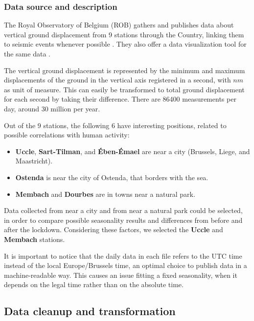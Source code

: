 \documentclass[12pt]{article}
\begin{document}
\subsubsection{Data source and description}
The Royal Observatory of Belgium (ROB) gathers and publishes \cite{RoyalDataPolicy,Data20200402} data about vertical ground displacement from 9 stations through the Country, linking them to seismic events whenever possible \cite{DataEvents20200402}. They also offer a data visualization tool for the same data \cite{DataVisualization20200402}.

The vertical ground displacement is represented by the minimum and maximum displacements of the ground in the vertical axis registered in a second, with $nm$ as unit of measure. This can easily be transformed to total ground displacement for each second by taking their difference. There are 86400 measurements per day, around 30 million per year.

Out of the 9 stations, the following 6 have interesting positions, related to possible correlations with human activity:
\begin{itemize}[topsep=0.5em,itemsep=0em,partopsep=0.5em]
	\item \textbf{Uccle}, \textbf{Sart-Tilman}, and \textbf{Ében-Émael} are near a city (Brussels, Liege, and Maastricht).
	\item \textbf{Ostenda} is near the city of Ostenda, that borders with the sea.
	\item \textbf{Membach} and \textbf{Dourbes} are in towns near a natural park.
\end{itemize}

Data collected from near a city and from near a natural park could be selected, in order to compare possible seasonality results and differences from before and after the lockdown. %
Considering these factors, we selected the \textbf{Uccle} and \textbf{Membach} stations.

It is important to notice that the daily data in each file refers to the UTC time instead of the local Europe/Brussels time, an optimal choice to publish data in a machine-readable way. This causes an issue fitting a fixed seasonality, when it depends on the legal time rather than on the absolute time.

\subsection{Data cleanup and transformation}\label{sec:cleanup-transform}
\end{document}
